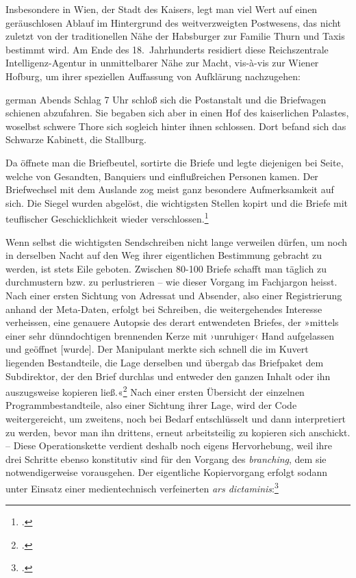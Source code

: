 \documentclass[a4paper,10pt]{article}
\newcommand{\anf}[1]{»#1«}
\newcommand{\inanf}[1]{›#1‹}
\newenvironment{zitat}{
\begin{foreigndisplayquote}{german}}%
{\end{foreigndisplayquote}}
\begin{document}
Insbesondere in Wien, der Stadt des Kaisers, legt man viel Wert auf einen geräuschlosen Ablauf im Hintergrund des weitverzweigten Postwesens, das nicht zuletzt von der traditionellen Nähe der Habsburger zur Familie Thurn und Taxis bestimmt wird. Am Ende des 18.~Jahrhunderts residiert diese Reichszentrale Intelligenz-Agentur in unmittelbarer Nähe zur Macht, vis-à-vis zur Wiener Hofburg, um ihrer speziellen Auffassung von Aufklärung nachzugehen:
\begin{zitat}
Abends Schlag 7 Uhr schloß sich die Postanstalt und die Briefwagen schienen abzufahren. Sie begaben sich aber in einen Hof des kaiserlichen Palastes, woselbst schwere Thore sich sogleich hinter ihnen schlossen. Dort befand sich das Schwarze Kabinett, die Stallburg.

Da öffnete man die Briefbeutel, sortirte die Briefe und legte diejenigen bei Seite, welche von Gesandten, Banquiers und einflußreichen Personen kamen. Der Briefwechsel mit dem Auslande zog meist ganz besondere Aufmerksamkeit auf sich. Die Siegel wurden abgelöst, die wichtigsten Stellen kopirt und die Briefe mit teuflischer Geschicklichkeit wieder verschlossen.\footcite[40]{koenig:1875}
\end{zitat}
Wenn selbst die wichtigsten Sendschreiben nicht lange verweilen dürfen, um noch in derselben Nacht auf den Weg ihrer eigentlichen Bestimmung gebracht zu werden, ist stets Eile geboten. Zwischen 80-100 Briefe schafft man täglich zu durchmustern bzw. zu perlustrieren – wie dieser Vorgang im Fachjargon heisst. Nach einer ersten Sichtung von Adressat und Absender, also einer Registrierung anhand der Meta-Daten, erfolgt bei Schreiben, die weitergehendes Interesse verheissen, eine genauere Autopsie des derart entwendeten Briefes, der \anf{mittels einer sehr dünndochtigen brennenden Kerze mit \inanf{unruhiger} Hand aufgelassen und geöffnet [wurde]. Der Manipulant merkte sich schnell die im Kuvert liegenden Bestandteile, die Lage derselben und übergab das Briefpaket dem Subdirektor, der den Brief durchlas und entweder den ganzen Inhalt oder ihn auszugsweise kopieren ließ.}\footcite[138]{stix:1937} Nach einer ersten Übersicht der einzelnen Programmbestandteile, also einer Sichtung ihrer Lage, wird der Code weitergereicht, um zweitens, noch bei Bedarf entschlüsselt und dann interpretiert zu werden, bevor man ihn drittens, erneut arbeitsteilig zu kopieren sich anschickt. – Diese Operationskette verdient deshalb noch eigens Hervorhebung, weil ihre drei Schritte ebenso konstitutiv sind für den Vorgang des \emph{branching}, dem sie notwendigerweise vorausgehen. Der eigentliche Kopiervorgang erfolgt sodann unter Einsatz einer medientechnisch verfeinerten \emph{ars dictaminis}:\footcite[Vgl. dazu][]{krautter:1982}
\end{document}
